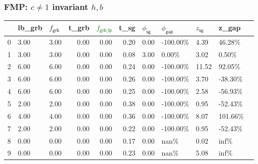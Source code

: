 \begin{frame}
  \frametitle{FMP: \(c \neq 1\) invariant \(h, b\)}
  \scriptsize
  \begin{tabular}{lllrrrlllll}
    \toprule
    {} & lb\_grb              & \(f_{\textsf{grb}}\)   & t\_grb                  & \textcolor{green}{\(f_{\textsf{grb\_lp}}\)}
       & t\_sg                & \(\phi_{\textsf{sg}}\) & \(\phi_{\textsf{gap}}\)
       & \( z_{\textsf{sg}}\) & z\_gap                                                                                                                                      \\
    \midrule
    0  & 3.00                 & 3.00                   & 0.00                    & 0.00                                        & 0.20 & 0.00 & -100.00\% & 4.39  & 46.28\%  \\
    1  & 3.00                 & 3.00                   & 0.00                    & 0.00                                        & 0.08 & 3.00 & 0.00\%    & 3.02  & 0.50\%   \\
    2  & 6.00                 & 6.00                   & 0.00                    & 0.00                                        & 0.24 & 0.00 & -100.00\% & 11.52 & 92.05\%  \\
    3  & 6.00                 & 6.00                   & 0.00                    & 0.00                                        & 0.26 & 0.00 & -100.00\% & 3.70  & -38.30\% \\
    4  & 6.00                 & 6.00                   & 0.00                    & 0.00                                        & 0.25 & 0.00 & -100.00\% & 2.58  & -56.93\% \\
    5  & 2.00                 & 2.00                   & 0.00                    & 0.00                                        & 0.38 & 0.00 & -100.00\% & 0.95  & -52.43\% \\
    6  & 4.00                 & 4.00                   & 0.00                    & 0.00                                        & 0.36 & 0.00 & -100.00\% & 8.07  & 101.66\% \\
    7  & 2.00                 & 2.00                   & 0.00                    & 0.00                                        & 0.22 & 0.00 & -100.00\% & 0.95  & -52.43\% \\
    8  & 0.00                 & 0.00                   & 0.00                    & 0.00                                        & 0.17 & 0.00 & nan\%     & 0.02  & inf\%    \\
    9  & 0.00                 & 0.00                   & 0.00                    & 0.00                                        & 0.23 & 0.00 & nan\%     & 5.08  & inf\%    \\

\end{tabular}
\end{frame}
